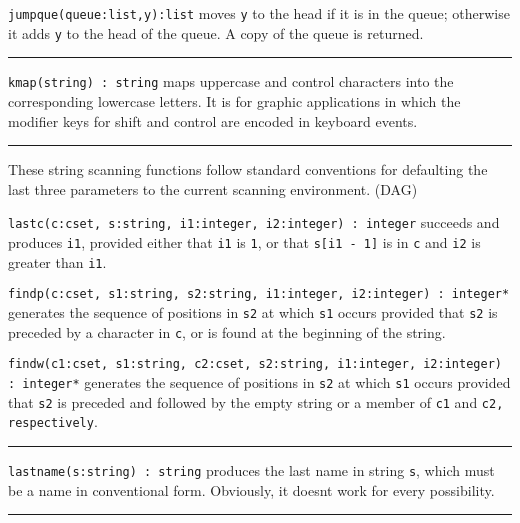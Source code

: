 \texttt{jumpque(}\texttt{queue}\texttt{:list,y):list} moves
\texttt{y} to the head if it is in the queue; otherwise it adds
\texttt{y} to the head of the queue. A copy of the queue is returned.


\vspace{0.25cm}\hrule{}

\texttt{kmap(string) : string} maps uppercase and control
characters into the corresponding
lowercase letters. It is for graphic applications in which the modifier
keys for shift and control are encoded in keyboard
events. 

\vspace{0.25cm}\hrule{}

These string scanning functions follow standard conventions for
defaulting the last three parameters to the current scanning
environment. (DAG)

\texttt{lastc(c:cset, s:string, i1:integer, i2:integer) : integer}
succeeds and produces \texttt{i1}, provided either that \texttt{i1} is
\texttt{1}, or that \texttt{s[i1 - 1]} is in \texttt{c} and \texttt{i2}
is greater than \texttt{i1}.

\texttt{findp(c:cset, s1:string, s2:string, i1:integer, i2:integer) :
integer*} generates the sequence of positions in \texttt{s2} at which
\texttt{s1} occurs provided that \texttt{s2} is preceded by a character
in \texttt{c}, or is found at the beginning of the string.

\texttt{findw(c1:cset, s1:string, c2:cset, s2:string, i1:integer,
i2:integer) : integer*} generates the sequence of positions in
\texttt{s2} at which \texttt{s1} occurs provided that \texttt{s2} is
preceded and followed by the empty string or a member of \texttt{c1}
and \texttt{c2, respectively}.

\vspace{0.25cm}\hrule{}

\texttt{lastname(s:string) : string} produces the last name in string
\texttt{s}, which must be a name in conventional form. Obviously, it
doesn{\textquotesingle}t work for every possibility. 

\vspace{0.25cm}\hrule{}

